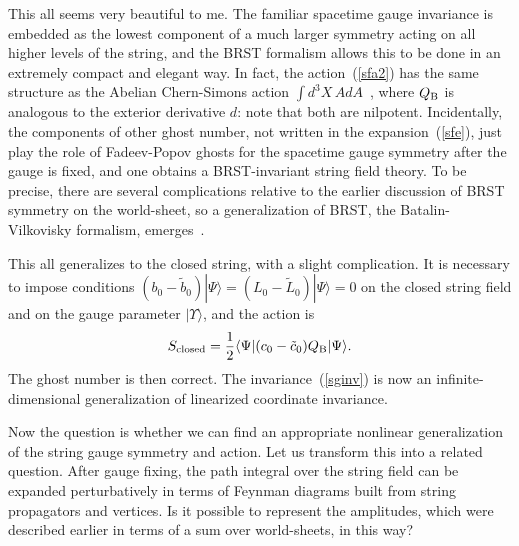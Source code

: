 This all seems very beautiful to me.  The familiar spacetime gauge
invariance is embedded as the lowest component of a much larger
symmetry acting on all higher levels of the string, and the BRST
formalism allows this to be done in an extremely compact and elegant
way.  In fact, the action~(\ref{sfa2}) has the same structure as the
Abelian Chern-Simons action $\int d^3 X \, AdA$~\cite{Wsft}, where
$Q_{\rm B}$ is analogous to the exterior derivative $d$: note that
both are nilpotent. Incidentally, the components of other ghost
number, not written in the expansion~(\ref{sfe}), just play the role
of Fadeev-Popov ghosts for the spacetime gauge symmetry after the
gauge is fixed, and one obtains a BRST-invariant string field
theory.  To be precise, there are several complications relative to
the earlier discussion of BRST symmetry on the world-sheet, so a
generalization of BRST, the Batalin-Vilkovisky formalism,
emerges~\cite{Tsft}.

This all generalizes to the closed string, with a slight complication.
It is necessary to impose conditions $(b_0 - \tilde b_0) | \Psi \rangle
= (L_0 - \tilde L_0) | \Psi \rangle = 0$ on the closed string field
and on the gauge parameter $| \Upsilon \rangle$,
and the action is
\begin{equation}
S_{\rm closed}
 = \frac{1}{2} \langle \Psi | (c_0 - \tilde c_0) Q_{\rm B} | \Psi
\rangle.
\end{equation}
The ghost number is then correct.  The invariance~(\ref{sginv})
is now an infinite-dimensional generalization of linearized coordinate
invariance.

Now the question is whether we can find an appropriate nonlinear
generalization of the string gauge symmetry and action.  Let us
transform this into a related question.  After gauge fixing, the path
integral over the string field can be expanded perturbatively in terms
of Feynman diagrams built from string propagators and vertices.  Is it
possible to represent the amplitudes, which were described earlier in
terms of a sum over world-sheets, in this way?

